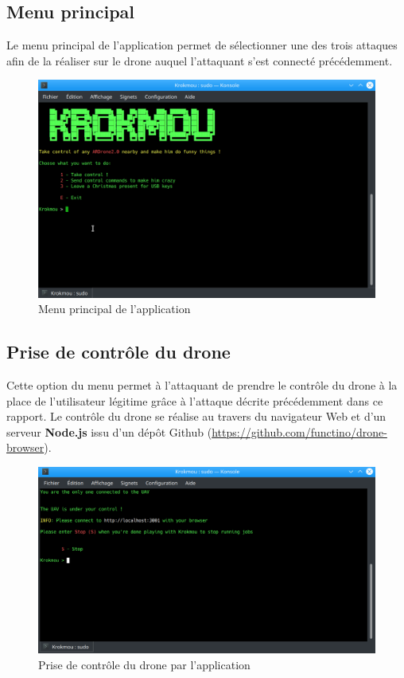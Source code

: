 \subsection{Menu principal}
Le menu principal de l'application permet de sélectionner une des trois attaques afin de la réaliser sur le drone auquel l'attaquant s'est connecté précédemment.

\begin{figure}[H]
  \centering
  \includegraphics[scale=0.3]{images/main_menu.png}
  \caption{Menu principal de l'application}
\end{figure}

\subsection{Prise de contrôle du drone}
Cette option du menu permet à l'attaquant de prendre le contrôle du drone à la place de l'utilisateur légitime grâce à l'attaque décrite précédemment dans ce rapport. Le contrôle du drone se réalise au travers du navigateur Web et d'un serveur \textbf{Node.js} issu d'un dépôt Github (\url{https://github.com/functino/drone-browser}).

\begin{figure}[H]
  \centering
  \includegraphics[scale=0.3]{images/taking_control.png}
  \caption{Prise de contrôle du drone par l'application}
\end{figure}

